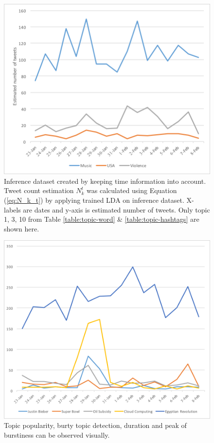 \documentclass[a4paper]{report}
\begin{document}
\begin{figure}[!ht]
\begin{center}
    \includegraphics[scale=0.75]{graph1}
\caption{Inference dataset created by keeping time information into account. Tweet count estimation $N_k^t$ was calculated using Equation (\ref{eq:N_k_t}) by applying trained LDA on inference dataset. X-labels are dates and y-axis is estimated number of tweets. Only topic 1, 3, 10 from Table \ref{table:topic-word} \& \ref{table:topic-hashtags} are shown here.}
\label{fig:hashtag-related}
\end{center}
\end{figure}

\begin{figure}[!ht]
\begin{center}
    \includegraphics[scale=0.7]{graph2}
\caption{Topic popularity, burty topic detection, duration and peak of burstiness can be observed visually.}
\label{fig:tweet-topic-count}
\end{center}
\end{figure}
\end{document}
